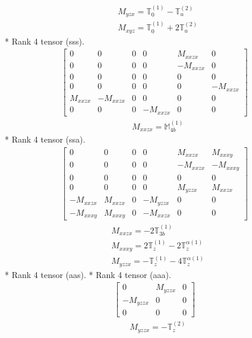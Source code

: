 \documentclass[fleqn,8pt,landscape]{jsarticle}
\begin{document}
\begin{align*}
& M_{yzx} = \mathbb{T}_{0}^{(1)} - \mathbb{T}_{u}^{(2)} \\
& M_{xyz} = \mathbb{T}_{0}^{(1)} + 2 \mathbb{T}_{u}^{(2)}
\end{align*}
* Rank 4 tensor (sss).
\begin{align*}
\begin{bmatrix} 0 & 0 & 0 & 0 & M_{xxzx} & 0 \\ 0 & 0 & 0 & 0 & - M_{xxzx} & 0 \\ 0 & 0 & 0 & 0 & 0 & 0 \\ 0 & 0 & 0 & 0 & 0 & - M_{xxzx} \\ M_{xxzx} & - M_{xxzx} & 0 & 0 & 0 & 0 \\ 0 & 0 & 0 & - M_{xxzx} & 0 & 0 \end{bmatrix}
\end{align*}
\begin{align*}
& M_{xxzx} = \mathbb{M}_{4b}^{(1)}
\end{align*}
* Rank 4 tensor (ssa).
\begin{align*}
\begin{bmatrix} 0 & 0 & 0 & 0 & M_{xxzx} & M_{xxxy} \\ 0 & 0 & 0 & 0 & - M_{xxzx} & - M_{xxxy} \\ 0 & 0 & 0 & 0 & 0 & 0 \\ 0 & 0 & 0 & 0 & M_{yzzx} & M_{xxzx} \\ - M_{xxzx} & M_{xxzx} & 0 & - M_{yzzx} & 0 & 0 \\ - M_{xxxy} & M_{xxxy} & 0 & - M_{xxzx} & 0 & 0 \end{bmatrix}
\end{align*}
\begin{align*}
& M_{xxzx} = - 2 \mathbb{T}_{3b}^{(1)} \\
& M_{xxxy} = 2 \mathbb{T}_{z}^{(1)} - 2 \mathbb{T}_{z}^{\alpha(1)} \\
& M_{yzzx} = - \mathbb{T}_{z}^{(1)} - 4 \mathbb{T}_{z}^{\alpha(1)}
\end{align*}
* Rank 4 tensor (aas).
* Rank 4 tensor (aaa).
\begin{align*}
\begin{bmatrix} 0 & M_{yzzx} & 0 \\ - M_{yzzx} & 0 & 0 \\ 0 & 0 & 0 \end{bmatrix}
\end{align*}
\begin{align*}
& M_{yzzx} = - \mathbb{T}_{z}^{(2)}
\end{align*}
\end{document}
